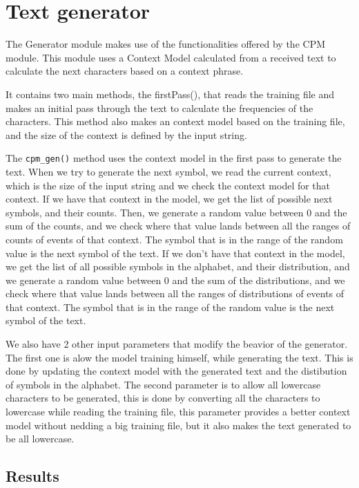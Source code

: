 \documentclass{article}
\begin{document}
\section{Text generator}
\label{sec:text-generator}

The Generator module makes use of the functionalities offered by the CPM module.
This module uses a Context Model calculated from a received text to calculate the
next characters based on a context phrase. 

It contains two main methods, the firstPass(), that reads the training file and makes an initial pass through the text to calculate the frequencies of the characters.
This method also makes an context model based on the training file, and the size of the context is defined by the input string. 

The \verb|cpm_gen()| method uses the context model in the first pass to generate the text.
When we try to generate the next symbol, we read the current context, which is the size of the input string and we check the context model for that context. If we have that context in the model, we get the list of possible next symbols, and their counts. Then, we generate a random value between 0 and the sum of the counts, and we check where that value lands between all the ranges of counts of events of that context. The symbol that is in the range of the random value is the next symbol of the text.
If we don't have that context in the model, we get the list of all possible symbols in the alphabet, and their distribution, and we generate a random value between 0 and the sum of the distributions, and we check where that value lands between all the ranges of distributions of events of that context. The symbol that is in the range of the random value is the next symbol of the text. 

We also have 2 other input parameters that modify the beavior of the generator. The first one is alow the model training himself, while generating the text. This is done by updating the context model with the generated text and the distibution of symbols in the alphabet.
The second parameter is to allow all lowercase characters to be generated, this is done by converting all the characters to lowercase while reading the training file, this parameter provides a better context model without nedding a big training file, but it also makes the text generated to be all lowercase.


\subsection{Results}
\end{document}
